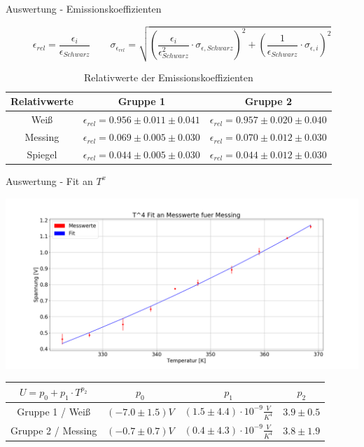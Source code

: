 \documentclass[12pt]{beamer}
\begin{document}
\begin{frame}{Auswertung - Emissionskoeffizienten}

\begin{equation*}
\epsilon_{rel}=\frac{\epsilon_i}{\epsilon_{Schwarz}} 
\qquad
\sigma_{\epsilon_{rel}}=\sqrt{\left(\frac{\epsilon_i}{\epsilon_{Schwarz}^2} \cdot  \sigma_{\epsilon,Schwarz}\right) ^2 + \left( \frac{1}{\epsilon_{Schwarz}}\cdot \sigma_{\epsilon,i}\right) ^2}
\end{equation*}

\begin{table}[H]
	\small
	\hskip -0.3cm
	\begin{tabular}{|c|c|c|}
		\hline Relativwerte & Gruppe 1 & Gruppe 2\\
		\hline Weiß & $\epsilon_{rel}=0.956 \pm 0.011 \pm 0.041 $ & $\epsilon_{rel}=0.957 \pm 0.020 \pm 0.040$\\
		\hline Messing & $\epsilon_{rel}=0.069 \pm 0.005 \pm 0.030$ & $\epsilon_{rel}= 0.070\pm 0.012 \pm 0.030$\\
		\hline Spiegel & $\epsilon_{rel}=0.044 \pm 0.005 \pm 0.030$ & $\epsilon_{rel}= 0.044\pm 0.012 \pm 0.030$\\
		\hline  
	\end{tabular}
	\caption{Relativwerte der Emissionskoeffizienten}
	\label{table:EpsilonRel}
\end{table}

\end{frame}


\begin{frame}{Auswertung - Fit an $T^x$}
\begin{center}
	\vskip -1cm
	\includegraphics[scale=0.25]{../Protokoll/Bilder/Gruppe2_Fit_Messing.png}
\end{center}
\vskip -1cm
\begin{table}[H]
	\small
	\centering
	\begin{tabular}{|c|c|c|c|}
		\hline $ U=p_0+p_1\cdot T^{p_2}$& $p_0$& $p_1$ & $p_2$\\
		\hline Gruppe 1 / Weiß & $(-7.0 \pm 1.5)V $ & $ (1.5 \pm 4.4  )\cdot 10^{-9}\frac{V}{K^4}$  & $ 3.9\pm 0.5 $ \\
		\hline Gruppe 2 / Messing &  $(-0.7 \pm 0.7)V $ & $ (0.4 \pm 4.3  )\cdot 10^{-9}\frac{V}{K^4}$  & $ 3.8\pm 1.9 $  \\
		\hline
	\end{tabular}
\end{table}
\end{frame}
\end{document}
